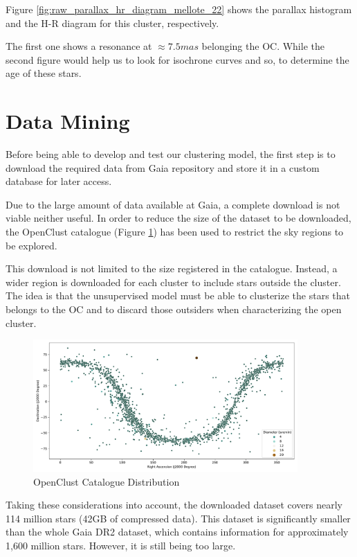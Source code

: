 \documentclass[11pt, a4paper, english]{book}
\begin{document}
Figure \ref{fig:raw_parallax_hr_diagram_mellote_22} shows the parallax histogram and the H-R diagram for this cluster, respectively.

The first one shows a resonance at $\approx 7.5mas$ belonging the OC. While the second figure would help us to look for isochrone curves and so,
to determine the age of these stars.

\section{Data Mining}

Before being able to develop and test our clustering model, the first step is to download the required data from Gaia repository
and store it in a custom database for later access.

Due to the large amount of data available at Gaia, a complete download is not viable neither useful.
In order to reduce the size of the dataset to be downloaded, the OpenClust catalogue \cite{dias2002new} (Figure \ref{fig:OpenClustComplete})
has been used to restrict the sky regions to be explored.

This download is not limited to the size registered in the catalogue. Instead, a wider region is downloaded for each cluster to include
stars outside the cluster. The idea is that the unsupervised model must be able to clusterize the stars that belongs to the OC and to discard
those outsiders when characterizing the open cluster.

\begin{figure}[htbp]
  \centering
  \includegraphics[width=0.9\textwidth]{../figures/openclust_catalogue.pdf}
  \caption{OpenClust Catalogue Distribution}
  \label{fig:OpenClustComplete}
\end{figure}

Taking these considerations into account, the downloaded dataset covers nearly 114 million stars (42GB of compressed data). This dataset is significantly
smaller than the whole Gaia DR2 dataset, which contains information for approximately 1,600 million stars. However, it is still being too large.
\end{document}
